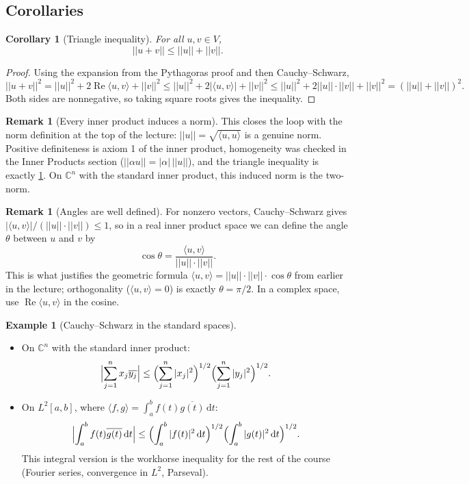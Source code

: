 \documentclass[11pt]{article}
\newcommand{\1}{\mathbf{1}}
\newcommand{\dd}{\,\mathrm{d}}
\theoremstyle{notestyle}
\newtheorem{corollary}[theorem]{Corollary}
\theoremstyle{definition}
\newtheorem{example}[theorem]{Example}
\newtheorem{remark}[theorem]{Remark}
\begin{document}
\subsection{Corollaries}
\begin{corollary}[Triangle inequality]
\label{cor:triangle}
For all $u, v \in V$,
$$||u + v|| \le ||u|| + ||v||.$$
\end{corollary}

\begin{proof}
Using the expansion from the Pythagoras proof and then Cauchy--Schwarz,
$$||u + v||^2 = ||u||^2 + 2\operatorname{Re}\langle u, v\rangle + ||v||^2
\le ||u||^2 + 2|\langle u, v\rangle| + ||v||^2
\le ||u||^2 + 2||u|| \cdot ||v|| + ||v||^2 = (||u|| + ||v||)^2.$$
Both sides are nonnegative, so taking square roots gives the inequality.
\end{proof}

\begin{remark}[Every inner product induces a norm]
This closes the loop with the norm definition at the top of the lecture:
$||u|| = \sqrt{\langle u, u\rangle}$ is a genuine norm. Positive definiteness is
axiom 1 of the inner product, homogeneity was checked in the Inner Products section
($||\alpha u|| = |\alpha|\,||u||$), and the triangle inequality is exactly
\cref{cor:triangle}. On $\mathbb{C}^n$ with the standard inner product, this
induced norm is the two-norm.
\end{remark}

\begin{remark}[Angles are well defined]
For nonzero vectors, Cauchy--Schwarz gives
$|\langle u, v\rangle|/(||u|| \cdot ||v||) \le 1$, so in a real inner product
space we can define the angle $\theta$ between $u$ and $v$ by
$$\cos\theta = \frac{\langle u, v\rangle}{||u|| \cdot ||v||}.$$
This is what justifies the geometric formula
$\langle u, v\rangle = ||u|| \cdot ||v|| \cdot \cos\theta$ from earlier in the
lecture; orthogonality ($\langle u, v\rangle = 0$) is exactly $\theta = \pi/2$.
In a complex space, use $\operatorname{Re}\langle u, v\rangle$ in the cosine.
\end{remark}

\begin{example}[Cauchy--Schwarz in the standard spaces]
\begin{itemize}
    \item On $\mathbb{C}^n$ with the standard inner product:
    $$\Bigl|\sum_{j=1}^{n} x_j\overline{y_j}\Bigr| \le
    \Bigl(\sum_{j=1}^{n}|x_j|^2\Bigr)^{1/2}
    \Bigl(\sum_{j=1}^{n}|y_j|^2\Bigr)^{1/2}.$$
    \item On $L^2[a,b]$, where $\langle f, g\rangle = \int_a^b f(t)\overline{g(t)}\dd t$:
    $$\Bigl|\int_a^b f(t)\overline{g(t)}\dd t\Bigr| \le
    \Bigl(\int_a^b |f(t)|^2\dd t\Bigr)^{1/2}
    \Bigl(\int_a^b |g(t)|^2\dd t\Bigr)^{1/2}.$$
    This integral version is the workhorse inequality for the rest of the course
    (Fourier series, convergence in $L^2$, Parseval).
\end{itemize}
\end{example}
\end{document}

